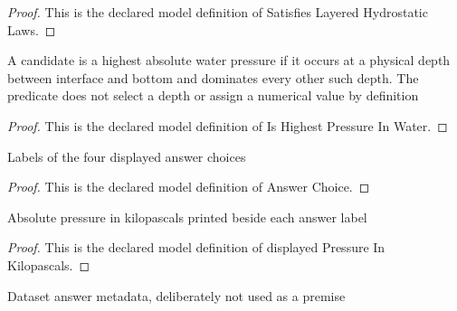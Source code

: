 \begin{proof}
  This is the declared model definition of Satisfies Layered Hydrostatic Laws.
\end{proof}
\begin{definition}
  \label{def:physics:phyx-mini-0385:phyxminiproblems-problemphyxmini0385-ishighestpressureinwater}
  A candidate is a highest absolute water pressure if it occurs at a physical depth between interface and bottom and dominates every other such depth. The predicate does not select a depth or assign a numerical value by definition
\end{definition}
\begin{proof}
  This is the declared model definition of Is Highest Pressure In Water.
\end{proof}
\begin{definition}
  \label{def:physics:phyx-mini-0385:phyxminiproblems-problemphyxmini0385-answerchoice}
  Labels of the four displayed answer choices
\end{definition}
\begin{proof}
  This is the declared model definition of Answer Choice.
\end{proof}
\begin{definition}
  \label{def:physics:phyx-mini-0385:phyxminiproblems-problemphyxmini0385-displayedpressureinkilopascals}
  Absolute pressure in kilopascals printed beside each answer label
\end{definition}
\begin{proof}
  This is the declared model definition of displayed Pressure In Kilopascals.
\end{proof}
\begin{definition}
  \label{def:physics:phyx-mini-0385:phyxminiproblems-problemphyxmini0385-recordeddatasetanswer}
  Dataset answer metadata, deliberately not used as a premise
\end{definition}
